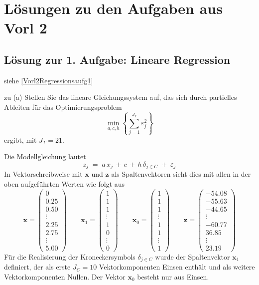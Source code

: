 \section{Lösungen zu den Aufgaben aus Vorl 2}
\subsection{Lösung zur 1. Aufgabe: Lineare Regression}
siehe \ref{Vorl2Regressionsaufg1}

zu (a) Stellen Sie das lineare Gleichungssystem auf, das sich durch partielles Ableiten
für das Optimierungsproblem
$$
\min\limits_{a,c,h} \left\{\sum_{j=1}^{J_T} \varepsilon_j^2\right\}
$$
ergibt, mit $J_T = 21$.

Die Modellgleichung lautet
\begin{equation}
z_j \; = \; a \, x_j \, + \, c \, + \, h \, \delta_{j \in C} \; + \; \varepsilon_j
\label{Modellgl1}
\end{equation}
In Vektorschreibweise mit $\boldsymbol x$ und $\boldsymbol z$ als Spaltenvektoren sieht
dies mit allen in der oben aufgeführten Werten wie folgt aus
$$
\boldsymbol x = \left(
\begin{array}{c}
0\\
0.25\\
0.50\\
\vdots\\
2.25\\
2.75\\
\vdots\\
5.00
\end{array}\right) \qquad
\boldsymbol x_1 = \left(
\begin{array}{c}
1\\
1\\
1\\
\vdots\\
1\\
0\\
\vdots\\
0
\end{array}\right)  \qquad
\boldsymbol x_0 = \left(
\begin{array}{c}
1\\
1\\
1\\
\vdots\\
1\\
1\\
\vdots\\
1
\end{array}\right) \qquad
\boldsymbol z = \left(
\begin{array}{c}
-54.08\\
-55.63\\
-44.65\\
\vdots\\
-60.77\\
36.85\\
\vdots\\
23.19
\end{array}\right)
$$
Für die Realisierung der Kroneckersymbols $\delta_{j \in C}$ wurde
der Spaltenvektor $\boldsymbol x_1$ definiert, der als erste
$J_C = 10$ Vektorkomponenten Einsen enthält und als weitere Vektorkomponenten Nullen.
Der Vektor $\boldsymbol x_0$ besteht nur aus Einsen.

